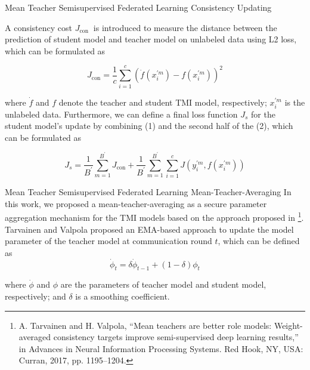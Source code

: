 \documentclass[UTF8]{beamer}
\begin{document}
\begin{frame}
{Mean Teacher Semisupervised Federated Learning}
{Consistency Updating}

A consistency cost $J_{\text {con }}$ is introduced to measure the distance between the prediction of student model and teacher model on unlabeled data using L2 loss, which can be formulated as

\begin{equation}
J_{\mathrm{con}}=\frac{1}{c} \sum_{i=1}^c\left(\dot{f}\left(x_i^{\prime m}\right)-f\left(x_i^{\prime m}\right)\right)^2
\end{equation}

where $\dot{f}$ and $f$ denote the teacher and student TMI model, respectively; $x_i^{\prime m}$ is the unlabeled data. Furthermore, we can define a final loss function $J_s$ for the student model's update by combining (1) and the second half of the (2), which can be formulated as

\begin{equation}
J_s=\frac{1}{B^{\prime}} \sum_{m=1}^{B^{\prime}} J_{\mathrm{con}}+\frac{1}{B^{\prime}} \sum_{m=1}^{B^{\prime}} \sum_{i=1}^c J\left(y_i^{\prime m}, f\left(x_i^{\prime m}\right)\right)
\end{equation}

\end{frame}

\begin{frame}
{Mean Teacher Semisupervised Federated Learning}
{Mean-Teacher-Averaging}
In this work, we proposed a mean-teacher-averaging as a secure parameter aggregation mechanism for the TMI models based on the approach proposed in \footnote{A. Tarvainen and H. Valpola, “Mean teachers are better role models: Weight-averaged consistency targets improve semi-supervised deep learning results,” in Advances in Neural Information Processing Systems. Red Hook, NY, USA: Curran, 2017, pp. 1195–1204.}.
Tarvainen and Valpola  proposed an \alert{EMA-based} approach to update the model parameter of the teacher model at communication round $t$, which can be defined as
\begin{equation}
	\dot{\phi}_t=\delta \dot{\phi}_{t-1}+(1-\delta) \phi_t
\end{equation}

where $\dot{\phi}$ and $\phi$ are the parameters of teacher model and student model, respectively; and $\delta$ is a smoothing coefficient.

\end{frame}
\end{document}
